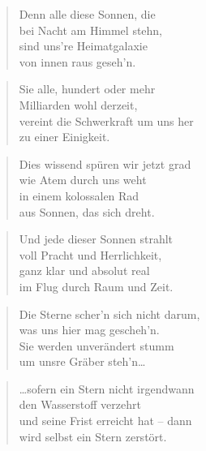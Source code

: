 \documentclass[10pt,a4paper]{article}
\begin{document}
\begin{paracol}{2}
\begin{verse}
Denn alle diese Sonnen, die \\
bei Nacht am Himmel stehn, \\
sind uns’re Heimatgalaxie \\
von innen raus geseh’n. \\
\end{verse}

\begin{verse}
Sie alle, hundert oder mehr \\
Milliarden wohl derzeit, \\
vereint die Schwerkraft um uns her \\
zu einer Einigkeit. \\
\end{verse}

\begin{verse}
Dies wissend spüren wir jetzt grad \\
wie Atem durch uns weht \\
in einem kolossalen Rad \\
aus Sonnen, das sich dreht. \\
\end{verse}

\begin{verse}
Und jede dieser Sonnen strahlt \\
voll Pracht und Herrlichkeit, \\
ganz klar und absolut real \\
im Flug durch Raum und Zeit. \\
\end{verse}

\begin{verse}
Die Sterne scher’n sich nicht darum, \\
was uns hier mag gescheh’n. \\
Sie werden unverändert stumm \\
um unsre Gräber steh’n… \\
\end{verse}

\begin{verse}
…sofern ein Stern nicht irgendwann \\
den Wasserstoff verzehrt \\
und seine Frist erreicht hat – dann \\
wird selbst ein Stern zerstört. \\
\end{verse}


\end{paracol}
\end{document}
